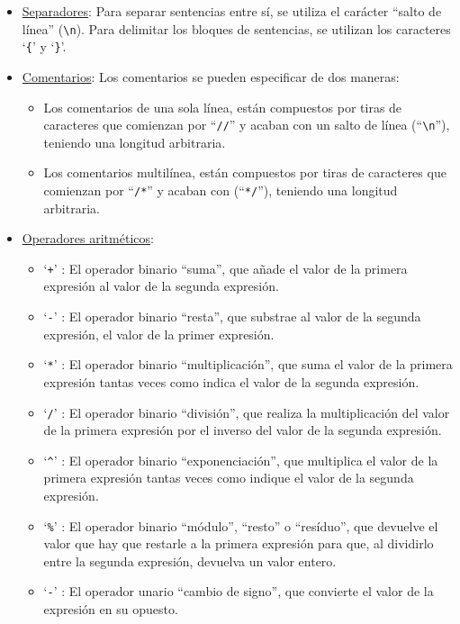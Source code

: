 \documentclass[12pt]{article}
\begin{document}
\begin{itemize}
\begin{itemize}
    \end{itemize}
    \item \underline{Separadores}: Para separar sentencias entre sí, se utiliza el carácter ``salto de línea'' (\texttt{\textbackslash n}). Para delimitar los bloques de sentencias, se utilizan los caracteres `\texttt{\{}' y `\texttt{\}}'.
    \item \underline{Comentarios}: Los comentarios se pueden especificar de dos maneras: 
    \begin{itemize}
        \item Los comentarios de una sola línea, están compuestos por tiras de caracteres que comienzan por ``\texttt{//}'' y acaban con un salto de línea (``\texttt{\textbackslash n}''), teniendo una longitud arbitraria.
        \item Los comentarios multilínea, están compuestos por tiras de caracteres que comienzan por ``\texttt{/*}'' y acaban con (``\texttt{*/}''), teniendo una longitud arbitraria.
    \end{itemize}
    \item \underline{Operadores aritméticos}:
    \begin{itemize}
        \item `\texttt{+}' : El operador binario ``suma'', que añade el valor de la primera expresión al valor de la segunda expresión.
        \item `\texttt{-}' : El operador binario ``resta'', que substrae al valor de la segunda expresión, el valor de la primer expresión.
        \item `\texttt{*}' : El operador binario ``multiplicación'', que suma el valor de la primera expresión tantas veces como indica el valor de la segunda expresión.
        \item `\texttt{/}' : El operador binario ``división'', que realiza la multiplicación del valor de la primera expresión por el inverso del valor de la segunda expresión.
        \item `\texttt{\textasciicircum}' : El operador binario ``exponenciación'', que multiplica el valor de la primera expresión tantas veces como indique el valor de la segunda expresión.
        \item `\texttt{\%}' : El operador binario ``módulo'', ``resto'' o ``resíduo'', que devuelve el valor que hay que restarle a la primera expresión para que, al dividirlo entre la segunda expresión, devuelva un valor entero.
        \item `\texttt{-}' : El operador unario ``cambio de signo'', que convierte el valor de la expresión en su opuesto.

\end{itemize}
\end{itemize}
\end{document}
